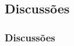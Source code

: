 \documentclass[hyperref={pdfpagelabels=false}]{beamer}
\begin{document}
            \subsection{Discussões}

                \begin{frame}\frametitle{Discussões}
                    \begin{figure}
                    \end{figure}
                \end{frame}
\end{document}
